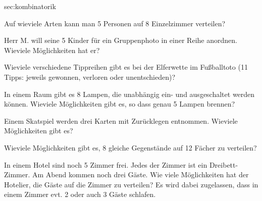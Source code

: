 \documentclass[../Mathe_Aufgaben.tex]{subfiles}
\begin{document}
\begin{komplexaufgaben}{sec:kombinatorik}
{		\item Auf wieviele Arten kann man 5 Personen auf 8 Einzelzimmer verteilen?

		\item Herr M. will seine 5 Kinder für ein Gruppenphoto in einer Reihe anordnen. Wieviele Möglichkeiten hat er?

		\item Wieviele verschiedene Tippreihen gibt es bei der Elferwette im Fußballtoto (11 Tipps: jeweils gewonnen, verloren oder unentschieden)?

		\item In einem Raum gibt es 8 Lampen, die unabhängig ein- und ausgeschaltet werden können. Wieviele Möglichkeiten gibt es, so dass genau 5 Lampen brennen?

		\item Einem Skatspiel werden drei Karten mit Zurücklegen entnommen. Wieviele Möglichkeiten gibt es?

		\item Wieviele Möglichkeiten gibt es, 8 gleiche Gegenstände auf 12 Fächer zu verteilen?

		\item In einem Hotel sind noch 5 Zimmer frei. Jedes der Zimmer ist ein Dreibett-Zimmer. Am Abend kommen noch drei Gäste. Wie viele Möglichkeiten hat der Hotelier, die Gäste auf die Zimmer zu verteilen? Es wird dabei zugelassen, dass in einem Zimmer evt. 2 oder auch 3 Gäste schlafen.
	}





\end{komplexaufgaben}
\end{document}
